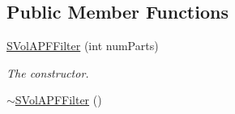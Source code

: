 \subsection*{Public Member Functions}
\begin{DoxyCompactItemize}
\item 
\hyperlink{classSVolAPFFilter_a6d1d4e7fa5b0b2916ef801b73258b00d}{S\+Vol\+A\+P\+F\+Filter} (int num\+Parts)
\begin{DoxyCompactList}\small\item\em The constructor. \end{DoxyCompactList}\item 
\hyperlink{classSVolAPFFilter_a18c961a2cac2076288c5195502ca0d8f}{$\sim$\+S\+Vol\+A\+P\+F\+Filter} ()\hypertarget{classSVolAPFFilter_a18c961a2cac2076288c5195502ca0d8f}{}\label{classSVolAPFFilter_a18c961a2cac2076288c5195502ca0d8f}


\end{DoxyCompactItemize}
